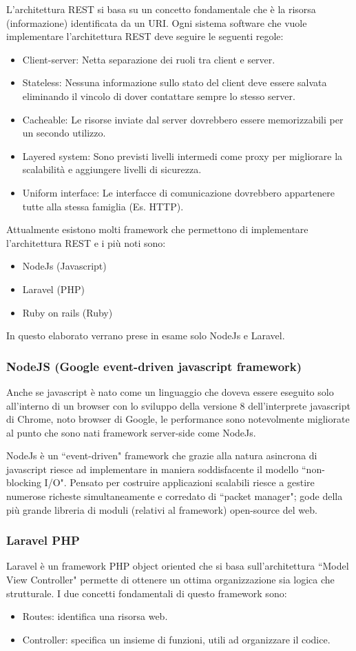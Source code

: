 L'architettura REST si basa su un concetto fondamentale che è la risorsa (informazione) identificata da un URI. Ogni sistema software che vuole implementare l'architettura REST deve seguire le seguenti regole:
\begin{itemize}
	\item Client-server: Netta separazione dei ruoli tra client e server.
	\item Stateless: Nessuna informazione sullo stato del client deve essere salvata eliminando il vincolo di dover contattare sempre lo stesso server.
	\item Cacheable: Le risorse inviate dal server dovrebbero essere memorizzabili per un secondo utilizzo.
	\item Layered system: Sono previsti livelli intermedi come proxy per migliorare la scalabilità e aggiungere livelli di sicurezza.
	\item Uniform interface: Le interfacce di comunicazione dovrebbero appartenere tutte alla stessa famiglia (Es. HTTP).
\end{itemize}
Attualmente esistono molti framework che permettono di implementare l'architettura REST e i più noti sono:
\begin{itemize}
	\item NodeJs (Javascript)
	\item Laravel (PHP)
	\item Ruby on rails (Ruby)
\end{itemize}
In questo elaborato verrano prese in esame solo NodeJs e Laravel.
\subsubsection{NodeJS (Google event-driven javascript framework)}
Anche se javascript è nato come un linguaggio che doveva essere eseguito solo all'interno di un browser con lo sviluppo della versione 8 dell'interprete javascript di Chrome, noto browser di Google, le performance sono notevolmente migliorate al punto che sono nati framework server-side come NodeJs. 

NodeJs è un ``event-driven" framework che grazie alla natura asincrona di javascript riesce ad implementare in maniera soddisfacente il modello ``non-blocking I/O". Pensato per costruire applicazioni scalabili riesce a gestire numerose richeste simultaneamente e corredato di ``packet manager"; gode della più grande libreria di moduli (relativi al framework) open-source del web.


\subsubsection{Laravel PHP}
Laravel è un framework PHP object oriented che si basa sull'architettura ``Model View Controller" permette di ottenere un ottima organizzazione sia logica che strutturale. I due concetti fondamentali di questo framework sono:
\begin{itemize}
	\item Routes: identifica una risorsa web.
	\item Controller: specifica un insieme di funzioni, utili ad organizzare il codice.

\end{itemize}
